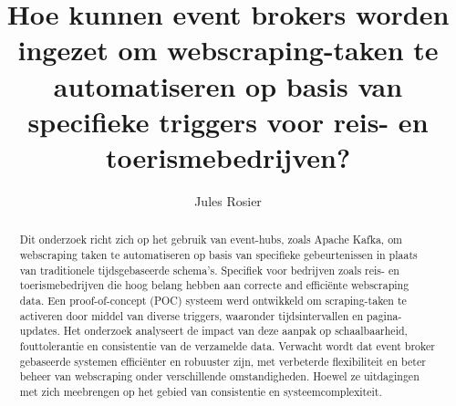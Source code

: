 \documentclass{hogent-article}
\title{Hoe kunnen event brokers worden ingezet om webscraping-taken te automatiseren op basis van specifieke triggers voor reis- en toerismebedrijven?}
\author{Jules Rosier}
\begin{document}
\begin{abstract}
  Dit onderzoek richt zich op het gebruik van event-hubs, zoals Apache Kafka, om webscraping taken te automatiseren op basis van specifieke gebeurtenissen in plaats van traditionele tijdsgebaseerde schema's. Specifiek voor bedrijven zoals reis- en toerismebedrijven die hoog belang hebben aan correcte and efficiënte webscraping data. Een proof-of-concept (POC) systeem werd ontwikkeld om scraping-taken te activeren door middel van diverse triggers, waaronder tijdsintervallen en pagina-updates. Het onderzoek analyseert de impact van deze aanpak op schaalbaarheid, fouttolerantie en consistentie van de verzamelde data. Verwacht wordt dat event broker gebaseerde systemen efficiënter en robuuster zijn, met verbeterde flexibiliteit en beter beheer van webscraping onder verschillende omstandigheden. Hoewel ze uitdagingen met zich meebrengen op het gebied van consistentie en systeemcomplexiteit.
\end{abstract}

\tableofcontents



\printbibliography[heading=bibintoc]
\end{document}
